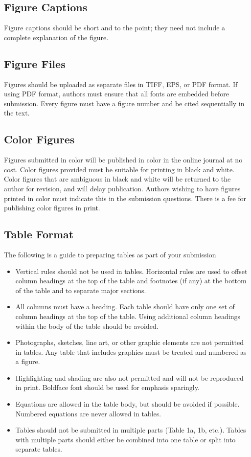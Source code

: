 \documentclass[Journal,letterpaper]{ascelike-new}
\begin{document}
\subsection{Figure Captions}

Figure captions should be short and to the point; they need not include a complete explanation of the figure.

\subsection{Figure Files}

Figures should be uploaded as separate files in TIFF, EPS, or PDF format. If using PDF format, authors must ensure that all fonts are embedded before submission. Every figure must have a figure number and be cited sequentially in the text.

\subsection{Color Figures}

Figures submitted in color will be published in color in the online journal at no cost. Color figures provided must be suitable for printing in black and white. Color figures that are ambiguous in black and white will be returned to the author for revision, and will delay publication. Authors wishing to have figures printed in color must indicate this in the submission questions. There is a fee for publishing color figures in print.

\subsection{Table Format}
The following is a guide to preparing tables as part of your submission
\begin{itemize}
\item Vertical rules should not be used in tables. Horizontal rules are used to offset column headings at the top of the table and footnotes (if any) at the bottom of the table and to separate major sections.
\item All columns must have a heading. Each table should have only one set of column headings at the top of the table. Using additional column headings within the body of the table should be avoided.
\item Photographs, sketches, line art, or other graphic elements are not permitted in tables. Any table that includes graphics must be treated and numbered as a figure.
\item Highlighting and shading are also not permitted and will not be reproduced in print. Boldface font should be used for emphasis sparingly.
\item Equations are allowed in the table body, but should be avoided if possible. Numbered equations are never allowed in tables.
\item Tables should not be submitted in multiple parts (Table 1a, 1b, etc.). Tables with multiple parts should either be combined into one table or split into separate tables.
\end{itemize}
\end{document}
